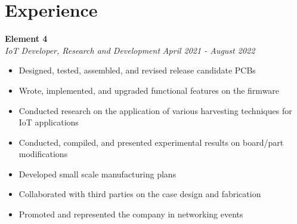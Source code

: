 \documentclass[a4paper,20pt]{article}
\begin{document}
\section{Experience}
    \vspace{-1pt}
        \textbf{Element 4}\hspace{13.5 cm}
        \textit{}\\
        \textit{IoT Developer, Research and Development} \hspace{7.5 cm}
        \textit{April 2021 - August 2022} \\
        \vspace{-8pt}
        
    \begin{itemize}
        \item Designed, tested, assembled, and revised release candidate PCBs \vspace{-5pt}
        \item  Wrote, implemented, and upgraded functional features on the firmware\vspace{-5pt}
        \item Conducted research on the application of various harvesting techniques for IoT applications \vspace{-5pt}
        \item Conducted, compiled, and presented experimental results on board/part modifications  \vspace{-5pt}
        \item Developed small scale manufacturing plans \vspace{-5pt}
        \item Collaborated with third parties on the case design and fabrication \vspace{-5pt}
        \item Promoted and represented the company in networking events 
    \end{itemize}
\end{document}
